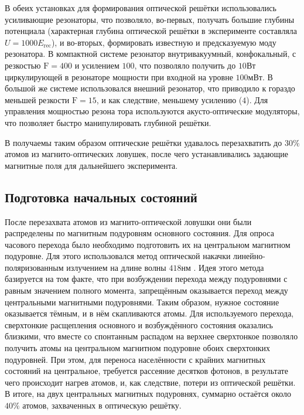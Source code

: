 В обеих установках для формирования оптической решётки использовались усиливающие резонаторы, что позволяло, во-первых, получать большие глубины потенциала (характерная глубина оптической решётки в эксперименте составляла $U = 1000\unit{E}_{\text{rec}}$), и во-вторых, формировать известную и предсказуемую моду резонатора.
В компактной системе резонатор внутривакуумный, конфокальный, с резкостью $\mathrm{F} = 400$ и усилением $100$, что позволяло получить до $10\unit{Вт}$ циркулирующей в резонаторе мощности при входной на уровне $100\unit{мВт}$.
В большой же системе использовался внешний резонатор, что приводило к гораздо меньшей резкости $\mathrm{F} = 15$, и как следствие, меньшему усилению ($4$). 
Для управления мощностью резона тора используются акусто-оптические модуляторы, что позволяет быстро манипулировать глубиной решётки.

В получаемы таким образом оптические решётки удавалось перезахватить до $30\%$ атомов из магнито-оптических ловушек, после чего устанавливались задающие магнитные поля для дальнейшего эксперимента.

\subsection{Подготовка начальных состояний}

После перезахвата атомов из магнито-оптической ловушки они были распределены по магнитным подуровням основного состояния. 
Для опроса часового перехода было необходимо подготовить их на центральном магнитном подуровне. 
Для этого использовался метод оптической накачки линейно-поляризованным излучением на длине волны $418\unit{нм}$ \cite{fedorova2020simultaneous}.
Идея этого метода базируется на том факте, что при возбуждении перехода между подуровнями с равным значением полного момента, запрещённым оказывается переход между центральными магнитными подуровнями. 
Таким образом, нужное состояние оказывается тёмным, и в нём скапливаются атомы.
Для используемого перехода, сверхтонкие расщепления основного и возбуждённого состояния оказались близкими, что вместе со спонтанным распадом на верхнее сверхтонкое позволяло получить атомы на центральном магнитном подуровне обоих сверхтонких подуровней.
При этом, для переноса населённости с крайних магнитных состояний на центральное, требуется рассеяние десятков фотонов, в результате чего происходит нагрев атомов, и, как следствие, потери из оптической решётки. 
В итоге, на двух центральных магнитных подуровнях, суммарно остаётся около $40\%$ атомов, захваченных в оптическую решётку.  

